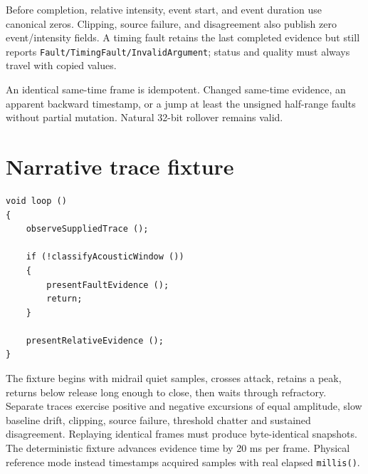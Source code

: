\documentclass[11pt]{article}
\begin{document}
Before completion, relative intensity, event start, and event duration use
canonical zeros. Clipping, source failure, and disagreement also publish zero
event/intensity fields. A timing fault retains the last completed evidence but
still reports \texttt{Fault/TimingFault/InvalidArgument}; status and quality
must always travel with copied values.

An identical same-time frame is idempotent. Changed same-time evidence, an
apparent backward timestamp, or a jump at least the unsigned half-range faults
without partial mutation. Natural 32-bit rollover remains valid.

\clearpage
\section{Narrative trace fixture}
\begin{lstlisting}[style=adkcpp]
void loop ()
{
    observeSuppliedTrace ();

    if (!classifyAcousticWindow ())
    {
        presentFaultEvidence ();
        return;
    }

    presentRelativeEvidence ();
}
\end{lstlisting}
The fixture begins with midrail quiet samples, crosses attack, retains a peak,
returns below release long enough to close, then waits through refractory.
Separate traces exercise positive and negative excursions of equal amplitude,
slow baseline drift, clipping, source failure, threshold chatter and sustained
disagreement. Replaying identical frames must produce byte-identical snapshots.
The deterministic fixture advances evidence time by 20 ms per frame. Physical
reference mode instead timestamps acquired samples with real elapsed
\texttt{millis()}.
\end{document}
